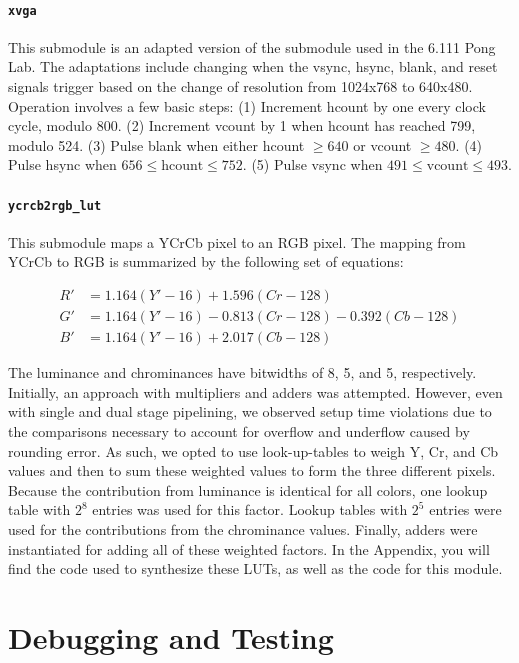 \documentclass[10pt]{article}
\begin{document}
{\paragraph{{\tt xvga}}
This submodule is an adapted version of the submodule used in the 6.111 Pong Lab. The adaptations include changing when the vsync, hsync, blank, and reset signals trigger based on the change of resolution from 1024x768 to 640x480. Operation involves a few basic steps\cite{xvga}: (1) Increment hcount by one every clock cycle, modulo 800. (2) Increment vcount by 1 when hcount has reached 799, modulo 524. (3) Pulse blank when either hcount $\geq 640$ or vcount $\geq 480$. (4) Pulse hsync when $656 \leq \text{hcount} \leq 752$. (5) Pulse vsync when $491 \leq \text{vcount} \leq 493$.

\paragraph{{\tt ycrcb2rgb\_lut}}
This submodule maps a YCrCb pixel to an RGB pixel. The mapping from YCrCb to RGB is summarized by the following set of equations\cite{ycrcb}:

\begin{align*}
R' & = 1.164(Y'-16) + 1.596(Cr-128) \\
G' & = 1.164(Y'-16) - 0.813(Cr-128) - 0.392(Cb-128) \\
B' & = 1.164(Y'-16) + 2.017(Cb-128)
\end{align*}

The luminance and chrominances have bitwidths of 8, 5, and 5, respectively. Initially, an approach with multipliers and adders was attempted. However, even with single and dual stage pipelining, we observed setup time violations due to the comparisons necessary to account for overflow and underflow caused by rounding error. As such, we opted to use look-up-tables to weigh Y, Cr, and Cb values and then to sum these weighted values to form the three different pixels. Because the contribution from luminance is identical for all colors, one lookup table with \( 2^8 \) entries was used for this factor. Lookup tables with \( 2^5 \) entries were used for the contributions from the chrominance values. Finally, adders were instantiated for adding all of these weighted factors. In the Appendix, you will find the code used to synthesize these LUTs, as well as the code for this module.

\section{Debugging and Testing}

}
\end{document}
